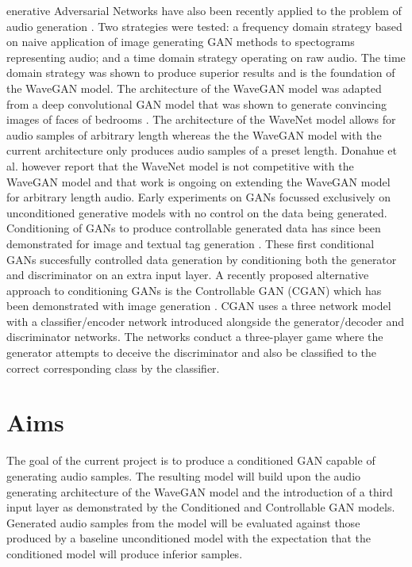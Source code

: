 \documentclass[a4paper, dvipsnames, titlepage]{article}
\begin{document}
enerative Adversarial Networks have also been recently applied to the problem of audio generation \citep{2018arXiv180204208D}.
Two strategies were tested: a frequency domain strategy based on naive application of image generating GAN methods to spectograms representing audio; and a time domain strategy operating on raw audio.
The time domain strategy was shown to produce superior results and is the foundation of the WaveGAN model.
The architecture of the WaveGAN model was adapted from a deep convolutional GAN model that was shown to generate convincing images of faces of bedrooms \citep{2015arXiv151106434R}.
\newline
\newline
The architecture of the WaveNet model allows for audio samples of arbitrary length whereas the the WaveGAN model with the current architecture only produces audio samples of a preset length.
Donahue et al. however report that the WaveNet model is not competitive with the WaveGAN model and that work is ongoing on extending the WaveGAN model for arbitrary length audio.
\newline
\newline
Early experiments on GANs focussed exclusively on unconditioned generative models with no control on the data being generated.
Conditioning of GANs to produce controllable generated data has since been demonstrated for image and textual tag generation \citep{2014arXiv1411.1784M}.
These first conditional GANs succesfully controlled data generation by conditioning both the generator and discriminator on an extra input layer.
\newline
\newline
A recently proposed alternative approach to conditioning GANs is the Controllable GAN (CGAN) which has been demonstrated with image generation \citep{2017arXiv170800598L}.
CGAN uses a three network model with a classifier/encoder network introduced alongside the generator/decoder and discriminator networks.
The networks conduct a three-player game where the generator attempts to deceive the discriminator and also be classified to the correct corresponding class by the classifier.

\newpage

\section{Aims}

The goal of the current project is to produce a conditioned GAN capable of generating audio samples.
The resulting model will build upon the audio generating architecture of the WaveGAN model and the introduction of a third input layer as demonstrated by the Conditioned and Controllable GAN models.
Generated audio samples from the model will be evaluated against those produced by a baseline unconditioned model with the expectation that the conditioned model will produce inferior samples.
\end{document}
